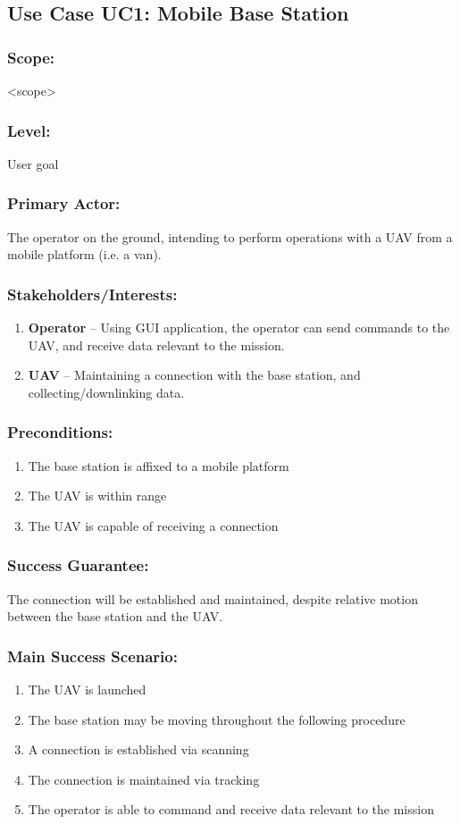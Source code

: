 \documentclass[ProductRequirements.tex]{subfiles}
\begin{document}
	\subsection{Use Case UC1: Mobile Base Station}
	\subsubsection*{Scope:}
	<scope>
	\subsubsection*{Level:}
	User goal
	\subsubsection*{Primary Actor:}
	The operator on the ground, intending to perform operations with a UAV from a mobile platform (i.e. a van).
	\subsubsection*{Stakeholders/Interests:}
	\begin{enumerate}\itemsep1pt
		\item \textbf{Operator} -- Using GUI application, the operator can send commands to the UAV, and receive data relevant to the mission. 
		\item \textbf{UAV} -- Maintaining a connection with the base station, and collecting/downlinking data. 
	\end{enumerate}
	\subsubsection*{Preconditions:}
	\begin{enumerate}\itemsep1pt
		\item The base station is affixed to a mobile platform
		\item The UAV is within range
		\item The UAV is capable of receiving a connection
	\end{enumerate}
	\subsubsection*{Success Guarantee:}
	The connection will be established and maintained, despite relative motion between the base station and the UAV.
	\subsubsection*{Main Success Scenario:}
	\begin{enumerate}\itemsep1pt
		\item The UAV is launched
		\item The base station may be moving throughout the following procedure
		\item A connection is established via scanning
		\item The connection is maintained via tracking
		\item The operator is able to command and receive data relevant to the mission 
	\end{enumerate}
\end{document}
